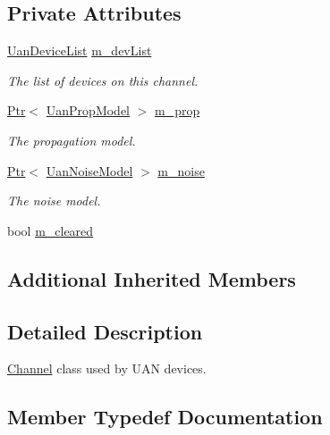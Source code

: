 \subsection*{Private Attributes}
\begin{DoxyCompactItemize}
\item 
\hyperlink{classns3_1_1UanChannel_ad0b0e3c9d6f44c7cedfddc6e4d918a99}{Uan\+Device\+List} \hyperlink{classns3_1_1UanChannel_aeabcd3ac6ad6e591c06fba9553cad25c}{m\+\_\+dev\+List}
\begin{DoxyCompactList}\small\item\em The list of devices on this channel. \end{DoxyCompactList}\item 
\hyperlink{classns3_1_1Ptr}{Ptr}$<$ \hyperlink{classns3_1_1UanPropModel}{Uan\+Prop\+Model} $>$ \hyperlink{classns3_1_1UanChannel_a630aeb5f0a32347fbde527697e879268}{m\+\_\+prop}
\begin{DoxyCompactList}\small\item\em The propagation model. \end{DoxyCompactList}\item 
\hyperlink{classns3_1_1Ptr}{Ptr}$<$ \hyperlink{classns3_1_1UanNoiseModel}{Uan\+Noise\+Model} $>$ \hyperlink{classns3_1_1UanChannel_a838c9526aa0c9683c3d390ffd14e4d77}{m\+\_\+noise}
\begin{DoxyCompactList}\small\item\em The noise model. \end{DoxyCompactList}\item 
bool \hyperlink{classns3_1_1UanChannel_abf640d5e1ca9a3e9c4476563ee91b7ce}{m\+\_\+cleared}
\end{DoxyCompactItemize}
\subsection*{Additional Inherited Members}


\subsection{Detailed Description}
\hyperlink{classns3_1_1Channel}{Channel} class used by U\+AN devices. 

\subsection{Member Typedef Documentation}
